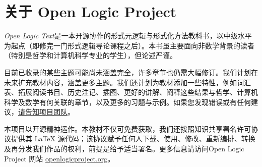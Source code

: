 \chapter*{关于 Open Logic Project}

\textit{Open Logic Text}是一本开源协作的形式元逻辑与形式化方法教科书，以中级水平为起点（即修完一门形式逻辑导论课程之后）。本书虽主要面向非数学背景的读者（特别是哲学和计算机科学专业的学生），但论述严谨。

目前已收录的某些主题可能尚未涵盖完全，许多章节也仍需大幅修订。我们计划在未来扩充教材内容，涵盖更多主题。我们还计划为教材添加一些特性，例如词汇表、拓展阅读书目、历史注记、插图、更好的讲解、阐释这些结果与哲学、计算机科学及数学有何关联的章节，以及更多的习题与示例。如果您发现错误或有任何建议，\href{https://github.com/OpenLogicProject/OpenLogic/wiki/Contributing}{请告知项目团队}。

本项目以开源精神运作。本教材不仅可免费获取，我们还按照知识共享署名许可协议提供其 \LaTeX{} 源代码；该协议赋予任何人下载、使用、修改、重新编排、转换及再分发我们作品的权利，前提是给予适当署名。更多信息请访问Open Logic Project 网站 \href{http://openlogicproject.org/}{openlogicproject.org}。